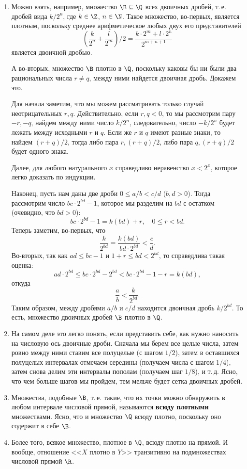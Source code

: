 \begin{enumerate}
\item Можно взять, например, множество $\B\subseteq\Q$ всех двоичных дробей, т.\,е. дробей вида $k/2^n$, где $k\in\Z$, $n\in\N$. Такое множество, во-первых, является плотным, поскольку среднее арифметическое любых двух его представителей
$$
\left(\frac{k}{2^n}+\frac{l}{2^m}\right)/2 = \frac{k\cdot 2^m+l\cdot 2^n}{2^{m+n+1}}
$$
является двоичной дробью.

А во-вторых, множество $\B$ плотно в $\Q$, поскольку каковы бы ни были два рациональных числа $r\ne q$, между ними найдется двоичная дробь. Докажем это. 

Для начала заметим, что мы можем рассматривать только случай неотрицательных $r,q$. Действительно, если $r,q< 0$, то мы рассмотрим пару $-r,-q$, найдем между ними число $k/2^n$, следовательно, число $-k/2^n$ будет лежать между исходными $r$ и $q$. Если же $r$ и $q$ имеют разные знаки, то найдем $(r+q)/2$, тогда либо пара $r,(r+q)/2$, либо пара $q,(r+q)/2$ будет одного знака.

Далее, для любого натурального $x$ справедливо неравенство $x<2^x$, которое легко доказать по индукции.

Наконец, пусть нам даны две дроби $0\le a/b<c/d$ ($b,d>0$). Тогда рассмотрим число $bc\cdot 2^{bd}-1$, которое мы разделим на $bd$ с остатком (очевидно, что $bd>0$):
$$
bc\cdot 2^{bd}-1 = k(bd)+r,\quad 0\le r<bd.
$$
Теперь заметим, во-первых, что
$$
\frac{k}{2^{bd}}=\frac{k(bd)}{bd\cdot 2^{bd}}<\frac{c}{d}.
$$
Во-вторых, так как $ad\le bc-1$ и $1+r\le bd<2^{bd}$, то справедлива такая оценка:
$$
ad\cdot 2^{bd}\le bc\cdot 2^{bd}-2^{bd}<bc\cdot 2^{bd}-1-r=k(bd),
$$
откуда
$$
\frac{a}{b}<\frac{k}{2^{bd}}.
$$
Таким образом, между дробями $a/b$ и $c/d$ находится двоичная дробь $k/2^{bd}$. То есть, множество двоичных дробей $\B$ плотно в $\Q$.


\item На самом деле это легко понять, если представить себе, как нужно наносить на числовую ось двоичные дроби. Сначала мы берем все целые числа, затем ровно между ними ставим все полуцелые (с шагом $1/2$), затем в оставшихся полуцелых интервалах отмечаем середины (получаем числа с шагом $1/4$), затем снова делим эти интервалы пополам (получаем шаг $1/8$), и т.\,д. Ясно, что чем больше шагов мы пройдем, тем мельче будет сетка двоичных дробей.

\item Множества, подобные $\B$, т.\,е. такие, что их точки можно обнаружить в любом интервале числовой прямой, называются \textbf{всюду плотными} множествами. Ясно, что и множество $\Q$ всюду плотно, поскольку оно содержит в себе $\B$.
\item Более того, всякое множество, плотное в $\Q$, всюду плотно на прямой. И вообще, отношение <<$X$ плотно в $Y$>> транзитивно на подмножествах числовой прямой $\R$.
\end{enumerate}


